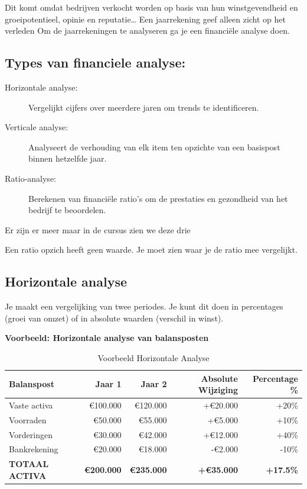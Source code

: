 \documentclass[a4paper,11pt]{article}
\begin{document}
Dit komt omdat bedrijven verkocht worden 
op basis van hun winstgevendheid en groeipotentieel,
opinie en reputatie\dots
Een jaarrekening geef alleen zicht op het verleden
\newline
Om de jaarrekeningen te analyseren ga je een financiële analyse doen.

\subsection{Types van financiele analyse:}
\begin{description}
    \item [Horizontale analyse:] Vergelijkt cijfers over meerdere jaren om trends te identificeren.
    \item [Verticale analyse:] Analyseert de verhouding van elk item ten opzichte van een basispost binnen hetzelfde jaar.
    \item [Ratio-analyse:] Berekenen van financiële ratio's om de prestaties en gezondheid van het bedrijf te beoordelen.
\end{description}
Er zijn er meer maar in de cursus zien we deze drie
\newline 

Een ratio opzich heeft geen waarde. Je moet zien waar
je de ratio mee vergelijkt.

\subsection{Horizontale analyse}
Je maakt een vergelijking van twee periodes.
Je kunt dit doen in percentages (groei van omzet)
of in absolute waarden (verschil in winst).

\textbf{Voorbeeld: Horizontale analyse van balansposten}

\begin{table}[ht]
    \centering
    \begin{tabular}{|l|r|r|r|r|}
        \hline
        \textbf{Balanspost} & \textbf{Jaar 1} & \textbf{Jaar 2} & \textbf{Absolute Wijziging} & \textbf{Percentage \%} \\
        \hline
        Vaste activa & €100.000 & €120.000 & +€20.000 & +20\% \\
        Voorraden & €50.000 & €55.000 & +€5.000 & +10\% \\
        Vorderingen & €30.000 & €42.000 & +€12.000 & +40\% \\
        Bankrekening & €20.000 & €18.000 & -€2.000 & -10\% \\
        \hline
        \textbf{TOTAAL ACTIVA} & \textbf{€200.000} & \textbf{€235.000} & \textbf{+€35.000} & \textbf{+17.5\%} \\
        \hline
    \end{tabular}
    \caption{Voorbeeld Horizontale Analyse}
\end{table}
\end{document}

